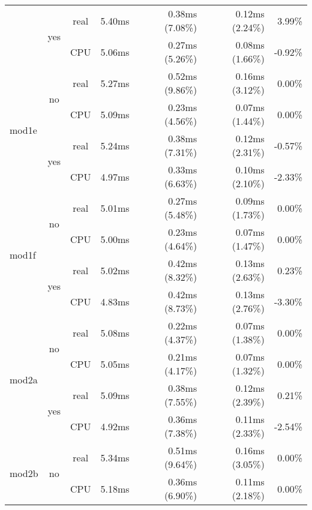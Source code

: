 \documentclass[en]{pracamgr}
\begin{document}
\begin{appendices}
\begin{small}
\begin{longtable}{|l|c|c|r|r|r|r|}
                          \cline{2-7}
                          & \multirow{2}{*}{yes} & real & 5.40ms & 0.38ms (7.08\%) & 0.12ms (2.24\%) & 3.99\% \\*
                          &                      & CPU  & 5.06ms & 0.27ms (5.26\%) & 0.08ms (1.66\%) & -0.92\% \\
\hline
\multirow{4}{*}{mod1e}    & \multirow{2}{*}{no}  & real & 5.27ms & 0.52ms (9.86\%) & 0.16ms (3.12\%) & 0.00\% \\*
                          &                      & CPU  & 5.09ms & 0.23ms (4.56\%) & 0.07ms (1.44\%) & 0.00\% \\*
                          \cline{2-7}
                          & \multirow{2}{*}{yes} & real & 5.24ms & 0.38ms (7.31\%) & 0.12ms (2.31\%) & -0.57\% \\*
                          &                      & CPU  & 4.97ms & 0.33ms (6.63\%) & 0.10ms (2.10\%) & -2.33\% \\
\hline
\multirow{4}{*}{mod1f}    & \multirow{2}{*}{no}  & real & 5.01ms & 0.27ms (5.48\%) & 0.09ms (1.73\%) & 0.00\% \\*
                          &                      & CPU  & 5.00ms & 0.23ms (4.64\%) & 0.07ms (1.47\%) & 0.00\% \\*
                          \cline{2-7}
                          & \multirow{2}{*}{yes} & real & 5.02ms & 0.42ms (8.32\%) & 0.13ms (2.63\%) & 0.23\% \\*
                          &                      & CPU  & 4.83ms & 0.42ms (8.73\%) & 0.13ms (2.76\%) & -3.30\% \\
\hline
\multirow{4}{*}{mod2a}    & \multirow{2}{*}{no}  & real & 5.08ms & 0.22ms (4.37\%) & 0.07ms (1.38\%) & 0.00\% \\*
                          &                      & CPU  & 5.05ms & 0.21ms (4.17\%) & 0.07ms (1.32\%) & 0.00\% \\*
                          \cline{2-7}
                          & \multirow{2}{*}{yes} & real & 5.09ms & 0.38ms (7.55\%) & 0.12ms (2.39\%) & 0.21\% \\*
                          &                      & CPU  & 4.92ms & 0.36ms (7.38\%) & 0.11ms (2.33\%) & -2.54\% \\
\hline
\multirow{4}{*}{mod2b}    & \multirow{2}{*}{no}  & real & 5.34ms & 0.51ms (9.64\%) & 0.16ms (3.05\%) & 0.00\% \\*
                          &                      & CPU  & 5.18ms & 0.36ms (6.90\%) & 0.11ms (2.18\%) & 0.00\% \\*

\end{longtable}
\end{small}
\end{appendices}
\end{document}
